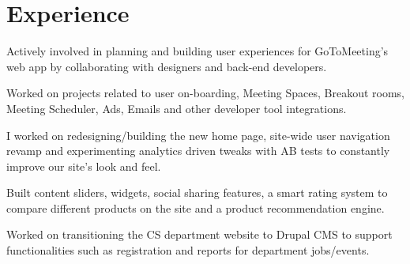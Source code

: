 \documentclass[]{my-resume-openfont}
\begin{document}
\begin{minipage}[t]{0.66\textwidth}


\section{Experience}

\vspace{\topsep} %
\begin{tightemize}
\item Actively involved in planning and building user experiences for GoToMeeting's web app by collaborating with designers and back-end developers.
\item Worked on projects related to user on-boarding, Meeting Spaces, Breakout rooms, Meeting Scheduler, Ads, Emails and other developer tool integrations.
\end{tightemize}
\sectionsep

\begin{tightemize}
\item I worked on redesigning/building the new home page, site-wide user navigation revamp and experimenting analytics driven tweaks with AB tests to constantly improve our site’s look and feel.
\item Built content sliders, widgets, social sharing features, a smart rating system to compare different products on the site and a product recommendation engine.
\end{tightemize}
\sectionsep

\begin{tightemize}
\item Worked on transitioning the CS department website to Drupal CMS to support functionalities such as registration and reports for department jobs/events.
\end{tightemize}
\sectionsep



\end{minipage}
\end{document}
